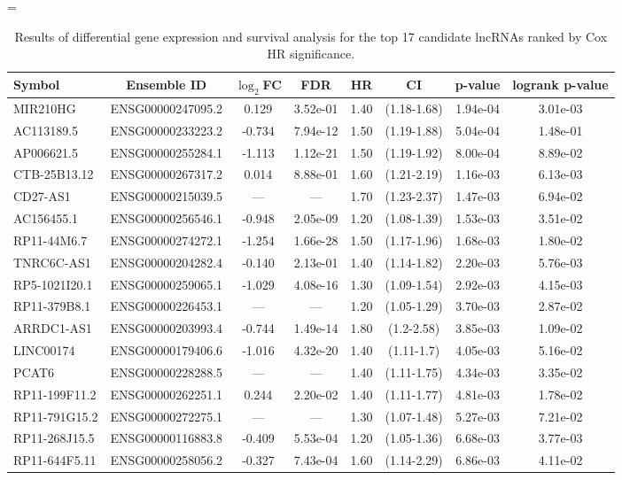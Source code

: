 \documentclass[fleqn,10pt]{wlscirep}
\begin{document}
\begin{table}[!htp]
  \setlength\tabcolsep{3pt}
  \centering
  \extrarowheight=\aboverulesep
    \addtolength{\extrarowheight}{\belowrulesep}
    \aboverulesep=0pt
    \belowrulesep=0pt
  \caption{Results of differential gene expression and survival analysis for the top 17 candidate lncRNAs ranked by Cox HR significance.}
    \begin{tabular}{lccccccc}
    \toprule[2pt]
   \rowcolor{Blue} \textbf{Symbol} & \textbf{Ensemble ID} &\textbf{$\log_{2}$FC}
     &\textbf{ FDR} &\textbf{ HR }   &\textbf{ CI}    & \textbf{p-value} & \textbf{logrank p-value }\\
    \midrule[1pt]
MIR210HG & ENSG00000247095.2 & 0.129 & 3.52e-01 & 1.40 & (1.18-1.68) & 1.94e-04 & 3.01e-03 \\
\rowcolor{LightBlue} AC113189.5 & ENSG00000233223.2 & -0.734 & 7.94e-12 & 1.50 & (1.19-1.88) & 5.04e-04 & 1.48e-01 \\
AP006621.5 & ENSG00000255284.1 & -1.113 & 1.12e-21 & 1.50 & (1.19-1.92) & 8.00e-04 & 8.89e-02 \\
\rowcolor{LightBlue} CTB-25B13.12 & ENSG00000267317.2 & 0.014 & 8.88e-01 & 1.60 & (1.21-2.19) & 1.16e-03 & 6.13e-03 \\
CD27-AS1 & ENSG00000215039.5 & --- & --- & 1.70 & (1.23-2.37) & 1.47e-03 & 6.94e-02 \\
\rowcolor{LightBlue} AC156455.1 & ENSG00000256546.1 & -0.948 & 2.05e-09 & 1.20 & (1.08-1.39) & 1.53e-03 & 3.51e-02 \\
RP11-44M6.7 & ENSG00000274272.1 & -1.254 & 1.66e-28 & 1.50 & (1.17-1.96) & 1.68e-03 & 1.80e-02 \\
\rowcolor{LightBlue} TNRC6C-AS1 & ENSG00000204282.4 & -0.140 & 2.13e-01 & 1.40 & (1.14-1.82) & 2.20e-03 & 5.76e-03 \\
RP5-1021I20.1 & ENSG00000259065.1 & -1.029 & 4.08e-16 & 1.30 & (1.09-1.54) & 2.92e-03 & 4.15e-03 \\
\rowcolor{LightBlue} RP11-379B8.1 & ENSG00000226453.1 & --- & --- & 1.20 & (1.05-1.29) & 3.70e-03 & 2.87e-02 \\
ARRDC1-AS1 & ENSG00000203993.4 & -0.744 & 1.49e-14 & 1.80 & (1.2-2.58) & 3.85e-03 & 1.09e-02 \\
\rowcolor{LightBlue} LINC00174 & ENSG00000179406.6 & -1.016 & 4.32e-20 & 1.40 & (1.11-1.7) & 4.05e-03 & 5.16e-02 \\
PCAT6 & ENSG00000228288.5 & --- & --- & 1.40 & (1.11-1.75) & 4.34e-03 & 3.35e-02 \\
\rowcolor{LightBlue} RP11-199F11.2 & ENSG00000262251.1 & 0.244 & 2.20e-02 & 1.40 & (1.11-1.77) & 4.81e-03 & 1.78e-02 \\
RP11-791G15.2 & ENSG00000272275.1 & --- & --- & 1.30 & (1.07-1.48) & 5.27e-03 & 7.21e-02 \\
\rowcolor{LightBlue} RP11-268J15.5 & ENSG00000116883.8 & -0.409 & 5.53e-04 & 1.20 & (1.05-1.36) & 6.68e-03 & 3.77e-03 \\
RP11-644F5.11 & ENSG00000258056.2 & -0.327 & 7.43e-04 & 1.60 & (1.14-2.29) & 6.86e-03 & 4.11e-02 \\
	    \bottomrule[1.5pt]
    \end{tabular}
  \label{Tab1}
\end{table}
\end{document}
